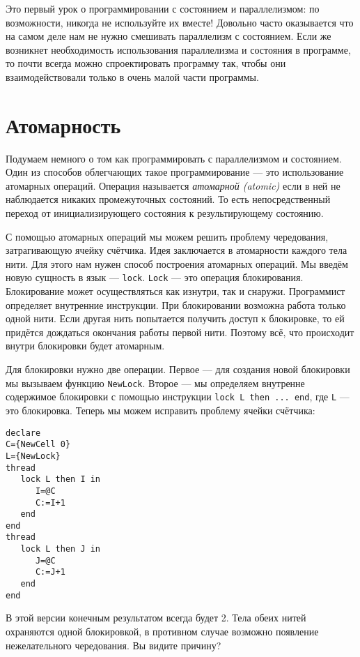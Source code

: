 Это первый урок о программировании с состоянием и параллелизмом: по возможности, никогда не используйте их вместе! Довольно часто оказывается что на самом деле нам не нужно смешивать параллелизм с состоянием. Если же возникнет необходимость использования параллелизма и состояния в программе, то почти всегда можно спроектировать программу так, чтобы они взаимодействовали только в очень малой части программы.

\section{Атомарность}

Подумаем немного о том как программировать с параллелизмом и состоянием. Один из способов облегчающих такое программирование --- это использование атомарных операций. Операция называется \emph{атомарной (atomic)} если в ней не наблюдается никаких промежуточных состояний. То есть непосредственный переход от инициализирующего состояния к результирующему состоянию.

С помощью атомарных операций мы можем решить проблему чередования, затрагивающую ячейку счётчика. Идея заключается в атомарности каждого тела нити. Для этого нам нужен способ построения атомарных операций. Мы введём новую сущность в язык --- \lstinline|lock|. \lstinline|Lock| --- это операция блокирования. Блокирование может осуществляться как изнутри, так и снаружи. Программист определяет внутренние инструкции. При блокировании возможна работа только одной нити. Если другая нить попытается получить доступ к блокировке, то ей придётся дождаться окончания работы первой нити. Поэтому всё, что происходит внутри блокировки будет атомарным.

Для блокировки нужно две операции. Первое --- для создания новой блокировки мы вызываем функцию \lstinline|NewLock|. Второе --- мы определяем внутренне содержимое блокировки с помощью инструкции \lstinline{lock L then ... end}, где \lstinline|L| --- это блокировка. Теперь мы можем исправить проблему ячейки счётчика:

\begin{lstlisting}
declare
C={NewCell 0}
L={NewLock}
thread
   lock L then I in
      I=@C
      C:=I+1
   end
end
thread
   lock L then J in
      J=@C
      C:=J+1
   end
end
\end{lstlisting}

В этой версии конечным результатом всегда будет 2. Тела обеих нитей охраняются одной блокировкой, в противном случае возможно появление нежелательного чередования. Вы видите причину?

